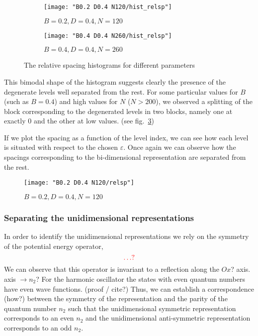 \documentclass[../thesis.tex]{subfiles}
\begin{document}
\begin{figure}[h!]
  \centering
  \begin{subfigure}[b]{0.49\textwidth}
    \centering
    \texttt{[image: "B0.2 D0.4 N120/hist\_relsp"]}
    \caption{\(B=0.2, D=0.4, N=120\)}%
    \label{fig:relsp-b0.2n120}
  \end{subfigure}
  \begin{subfigure}[b]{0.49\textwidth}
    \centering
    \texttt{[image: "B0.4 D0.4 N260/hist\_relsp"]} %
    \caption{\(B=0.4, D=0.4, N=260\)}%
    \label{fig:relsp-b0.4n260}
  \end{subfigure}
  \caption{The relative spacing histograms for different parameters}
\end{figure}

This bimodal shape of the histogram suggests clearly the presence of the degenerate
levels well separated from the rest.
For some particular values for $B$ (such as \(B = 0.4\)) and high values for
$N$ (\( N > 200 \)), we observed a splitting of the block corresponding to
the degenerated levels in two blocks, namely one at exactly 0 and the other at low values.
(see fig.~\ref{fig:relsp-b0.4n260})

If we plot the spacing as a function of the level index, we can see how
each level is situated with respect to the chosen \( \varepsilon \).
Once again we can observe how the spacings corresponding to the bi-dimensional
representation are separated from the rest.

\begin{figure}[H]
  \centering
  \texttt{[image: "B0.2 D0.4 N120/relsp"]}
  \caption{\(B=0.2, D=0.4, N=120\)}
\end{figure}

\subsubsection{Separating the unidimensional representations}

In order to identify the unidimensional representations we rely on the symmetry
of the potential energy operator,
\[
  \color{red}\dots ?
\]
We can observe that this operator is invariant to a reflection along the
{\color{red}\(Ox\)?} axis.
{\color{red} axis \(\rightarrow n_2\)?}
For the harmonic oscillator the states with even quantum numbers have even wave functions.
{\color{red} (proof / cite?)}
Thus, we can establish a correspondence {\color{red} (how?)} between the symmetry of the
representation and the parity of the quantum number \(n_2\) such that the
unidimensional symmetric representation corresponds to an even \(n_2\) and the
unidimensional anti-symmetric representation corresponds to an odd \(n_2\).
\end{document}
